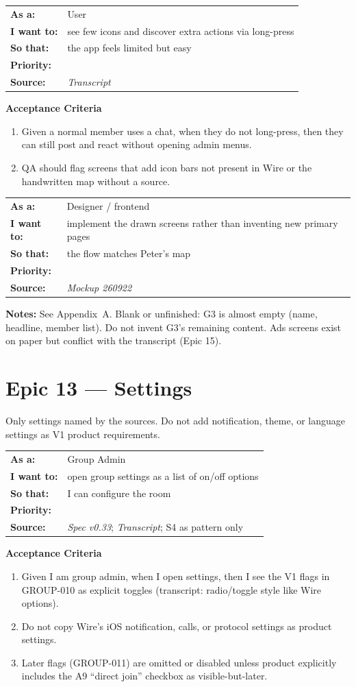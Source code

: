 \documentclass[11pt,a4paper]{article}
\makeatletter
\newcommand{\priPzero}{\colorbox{p0}{\makebox[4.6em]{\textcolor{white}{\scriptsize\bfseries P0 V1}}}}
\newcommand{\srcSpec}{\textit{Spec v0.33}}
\newcommand{\srcTx}{\textit{Transcript}}
\newcommand{\srcMock}{\textit{Mockup 260922}}
\newenvironment{story}[1]{%
  \Needspace{10\baselineskip}%
  \vspace{0.7em}%
  \noindent
  \colorbox{navy}{\makebox[\dimexpr\textwidth-2\fboxsep\relax][l]{\textcolor{white}{\bfseries\ #1}}}%
  \par\vspace{0.35em}%
}{\par\vspace{0.55em}}
\newcommand{\storymeta}[5]{%
  \noindent
  \begin{tabularx}{\textwidth}{@{}>{\bfseries}l X@{}}
    As a: & #1 \\
    I want to: & #2 \\
    So that: & #3 \\
    Priority: & #4 \\
    Source: & #5 \\
  \end{tabularx}
  \par\vspace{0.3em}
}
\newcommand{\achead}{\noindent\textbf{Acceptance Criteria}\par}
\newcommand{\notes}[1]{\noindent\textbf{Notes:} #1\par}
\makeatother
\begin{document}
\begin{story}{NAV-004 --- Wire-like, low-chrome interaction}
\storymeta{User}{see few icons and discover extra actions via long-press}{the app feels limited but easy}{\priPzero}{\srcTx}
\achead
\begin{enumerate}
  \item Given a normal member uses a chat, when they do not long-press, then they can still post and react without opening admin menus.
  \item QA should flag screens that add icon bars not present in Wire or the handwritten map without a source.
\end{enumerate}
\end{story}

\begin{story}{NAV-005 --- Screen inventory (mockup IDs)}
\storymeta{Designer / frontend}{implement the drawn screens rather than inventing new primary pages}{the flow matches Peter's map}{\priPzero}{\srcMock}
\notes{See Appendix~A. Blank or unfinished: G3 is almost empty (name, headline, member list). Do not invent G3's remaining content. Ads screens exist on paper but conflict with the transcript (Epic 15).}
\end{story}

\section{Epic 13 --- Settings}
Only settings named by the sources. Do not add notification, theme, or language settings as V1 product requirements.

\begin{story}{SET-001 --- Group settings screen}
\storymeta{Group Admin}{open group settings as a list of on/off options}{I can configure the room}{\priPzero}{\srcSpec; \srcTx; S4 as pattern only}
\achead
\begin{enumerate}
  \item Given I am group admin, when I open settings, then I see the V1 flags in GROUP-010 as explicit toggles (transcript: radio/toggle style like Wire options).
  \item Do not copy Wire's iOS notification, calls, or protocol settings as product settings.
  \item Later flags (GROUP-011) are omitted or disabled unless product explicitly includes the A9 ``direct join'' checkbox as visible-but-later.
\end{enumerate}
\end{story}
\end{document}
